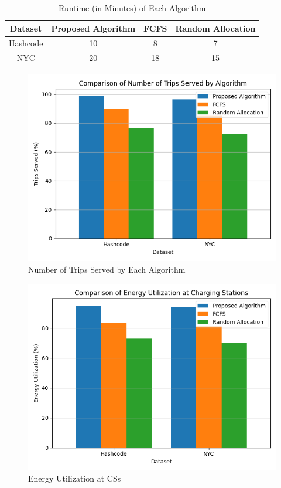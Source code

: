 \begin{table}[htbp]
\caption{Runtime (in Minutes) of Each Algorithm}
\centering
\begin{tabular}{|c|c|c|c|}
\hline
\textbf{Dataset} & \textbf{Proposed Algorithm} & \textbf{FCFS} & \textbf{Random Allocation} \\
\hline
Hashcode & 10 & 8 & 7 \\
NYC & 20 & 18 & 15 \\
\hline
\end{tabular}
\label{tab:runtime}
\end{table}

\begin{figure}[htbp]
\centering
\includegraphics[scale=0.55]{Crest/Images/trips_served_comparison.png}
\caption{Number of Trips Served by Each Algorithm}
\label{fig:trips_served}
\end{figure}

\begin{figure}[htbp]
\centering
\includegraphics[scale=0.55]{Crest/Images/energy_utilization_comparison.png}
\caption{Energy Utilization at CSs}
\label{fig:energy_utilization}
\end{figure}

